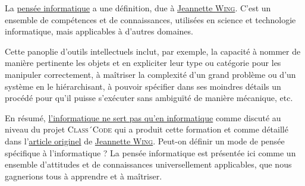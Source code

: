 La \href{https://interstices.info/la-pensee-informatique/}{pensée informatique} a une définition, due à \href{https://fr.wikipedia.org/wiki/Jeannette_Wing}{Jeannette \textsc{Wing}}. C’est un ensemble de compétences et de connaissances, utilisées en science et technologie informatique, mais applicables à d’autres domaines.

Cette panoplie d’outils intellectuels inclut, par exemple, la capacité à nommer de manière pertinente les objets et en expliciter leur type ou catégorie pour les manipuler correctement, à maîtriser la complexité d’un grand problème ou d’un système en le hiérarchisant, à pouvoir spécifier dans ses moindres détails un procédé pour qu’il puisse s’exécuter sans ambiguïté de manière mécanique, etc.

En résumé, \href{https://project.inria.fr/classcode/mais-pourquoi-classcode-parle-de-pensee-informatique/}{l’informatique ne sert pas qu’en informatique} comme discuté au niveau du projet \textsc{Class´Code} qui a produit cette formation et comme détaillé dans l'\href{https://interstices.info/la-pensee-informatique/}{article originel} de \href{https://interstices.info/auteur/jeannette-wing/}{Jeannette \textsc{Wing}}. Peut-on définir un mode de pensée spécifique à l'informatique ? La pensée informatique est présentée ici comme un ensemble d'attitudes et de connaissances universellement applicables, que nous gagnerions tous à apprendre et à maîtriser.

